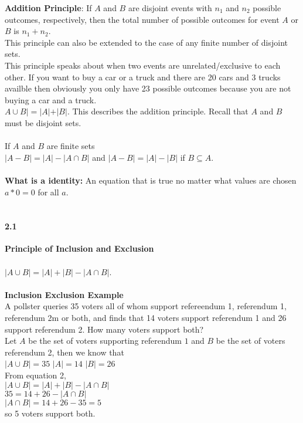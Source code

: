 \documentclass[14pt]{extreport}
\begin{document}
\textbf{Addition Principle}: If $A$ and $B$ are disjoint events with $n_1$ and $n_2$ possible outcomes, respectively, then the total number of possible outcomes for event $A$ or $B$ is $n_1 + n_2$.\\
This principle can also be extended to the case of any finite number of disjoint sets.\\
This principle speaks about when two events are unrelated/exclusive to each other. If you want to buy a car or a truck and there are 20 cars and 3 trucks availble then obviously you only have 23 possible outcomes because you are not buying a car and a truck.\\
$A \cup B| = |A| + |B|$. This describes the addition principle. Recall that $A$ and $B$ must be disjoint sets.\\\\

If $A$ and $B$ are finite sets\\
$|A - B| = |A| - |A \cap B|$ and $|A - B| = |A| - |B|$ if $B \subseteq A$.\\\\
\textbf{What is a identity:} An equation that is true no matter what values are chosen $a * 0 = 0$ for all $a$.\\\\

\paragraph{2.1} \textbf{Principle of Inclusion and Exclusion}\\\\
$|A \cup B| = |A| + |B| - |A \cap B|$.\\\\

\textbf{Inclusion Exclusion Example}\\
A pollster queries 35 voters all of whom support refereendum 1, referendum 1, referendum 2m or both, and finds that 14 voters support referendum 1  and 26 support referendum 2.
How many voters support both?\\
Let $A$ be the set of voters supporting referendum $1$ and $B$ be the set of voters referendum 2, then we know that\\
$|A \cup B| = 35$  $|A| = 14$  $|B| = 26$\\
From equation 2,\\
$|A \cup B| = |A| + |B| - |A \cap B|$\\
$35 = 14 + 26 -|A \cap B|$\\
$|A \cap B| = 14 + 26 - 35 = 5$\\
so 5 voters support both.\\\\
\end{document}
